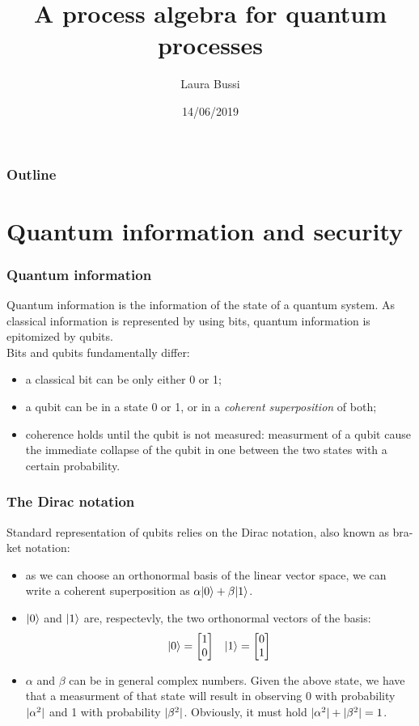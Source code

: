 \documentclass{beamer}
\title{A process algebra for quantum processes}
\author{Laura Bussi}
\date{14/06/2019}
\institute[Università di Pisa]
\DeclarePairedDelimiter\abs{\lvert}{\rvert}%
\DeclarePairedDelimiter\ket{\lvert}{\rangle}
\begin{document}
\frame{\titlepage}

\begin{frame}
\frametitle{Outline}
\tableofcontents
\end{frame}

\section{Quantum information and security}
 
\begin{frame}
\frametitle{Quantum information}
Quantum information is the information of the state of a quantum system. As classical information is represented by using bits, quantum information is epitomized by qubits. \\
Bits and qubits fundamentally differ:
\begin{itemize}
	\item a classical bit can be only either 0 or 1;
	\item a qubit can be in a state 0 or 1, or in a \emph{coherent superposition} of both;
	\item coherence holds until the qubit is not measured: measurment of a qubit cause 
	the immediate collapse of the qubit in one between the two states with a 
	certain probability.
\end{itemize}
\end{frame}

\begin{frame}
\frametitle{The Dirac notation}
Standard representation of qubits relies on the Dirac notation, also known as bra-ket notation:
\begin{itemize}
	\item as we can choose an orthonormal basis of the linear vector space, we can write 
	a coherent superposition as $\alpha \ket{0} + \beta \ket{1}$.
	\item $\ket{0}$ and $\ket{1}$ are, respectevly, the two orthonormal vectors of 
	the basis: 
	\begin{align*}
	\ket{0} = \begin{bmatrix}
           1 \\
           0 \\
         \end{bmatrix}
         & &
    \ket{1} = \begin{bmatrix}
    	   0 \\
    	   1 \\
    	 \end{bmatrix}
    \end{align*}
    \item $\alpha$ and $\beta$ can be in general complex numbers. Given the above state, 
    we have that a measurment of that state will result in observing 0 with probability 
    $\abs{\alpha^2}$ and 1 with probability $\abs{\beta^2}$. Obviously, it must hold 
    $\abs{\alpha^2} + \abs{\beta^2} = 1$.
\end{itemize}
\end{frame}
\end{document}
